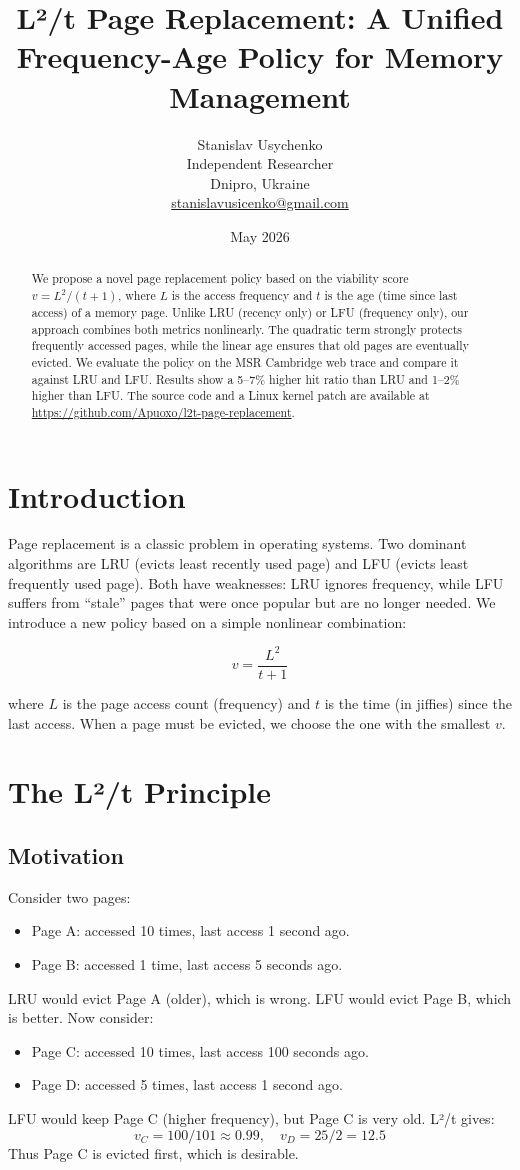\documentclass[12pt,a4paper]{article}
\title{\textbf{L²/t Page Replacement: A Unified Frequency-Age Policy for Memory Management}}
\author{Stanislav Usychenko\\
\small Independent Researcher\\
\small Dnipro, Ukraine\\
\href{mailto:stanislavusicenko@gmail.com}{stanislavusicenko@gmail.com}
}
\date{May 2026}
\begin{document}
\maketitle

\begin{abstract}
We propose a novel page replacement policy based on the viability score \(v = L^2 / (t + 1)\), where \(L\) is the access frequency and \(t\) is the age (time since last access) of a memory page. Unlike LRU (recency only) or LFU (frequency only), our approach combines both metrics nonlinearly. The quadratic term strongly protects frequently accessed pages, while the linear age ensures that old pages are eventually evicted. We evaluate the policy on the MSR Cambridge web trace and compare it against LRU and LFU. Results show a 5–7\% higher hit ratio than LRU and 1–2\% higher than LFU. The source code and a Linux kernel patch are available at \url{https://github.com/Apuoxo/l2t-page-replacement}.
\end{abstract}

\section{Introduction}
Page replacement is a classic problem in operating systems. Two dominant algorithms are LRU (evicts least recently used page) and LFU (evicts least frequently used page). Both have weaknesses: LRU ignores frequency, while LFU suffers from ``stale'' pages that were once popular but are no longer needed. We introduce a new policy based on a simple nonlinear combination:

\[
v = \frac{L^2}{t + 1}
\]

where \(L\) is the page access count (frequency) and \(t\) is the time (in jiffies) since the last access. When a page must be evicted, we choose the one with the smallest \(v\).

\section{The L²/t Principle}
\subsection{Motivation}
Consider two pages:
\begin{itemize}
    \item Page A: accessed 10 times, last access 1 second ago.
    \item Page B: accessed 1 time, last access 5 seconds ago.
\end{itemize}
LRU would evict Page A (older), which is wrong. LFU would evict Page B, which is better.
Now consider:
\begin{itemize}
    \item Page C: accessed 10 times, last access 100 seconds ago.
    \item Page D: accessed 5 times, last access 1 second ago.
\end{itemize}
LFU would keep Page C (higher frequency), but Page C is very old. L²/t gives:
\[
v_C = 100/101 \approx 0.99, \quad v_D = 25/2 = 12.5
\]
Thus Page C is evicted first, which is desirable.
\end{document}
